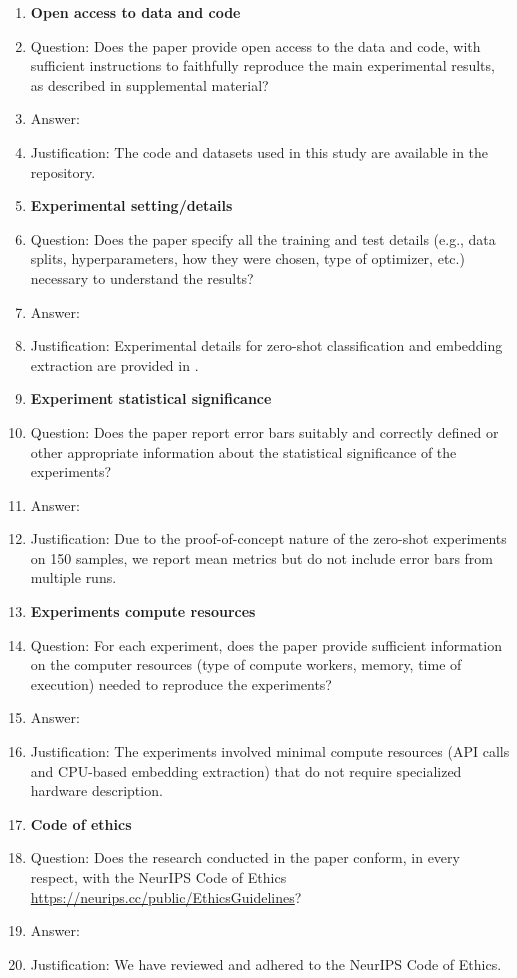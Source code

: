 \begin{enumerate}
\item {\bf Open access to data and code}
    \item[] Question: Does the paper provide open access to the data and code, with sufficient instructions to faithfully reproduce the main experimental results, as described in supplemental material?
    \item[] Answer: \answerYes{}
    \item[] Justification: The code and datasets used in this study are available in the repository.

\item {\bf Experimental setting/details}
    \item[] Question: Does the paper specify all the training and test details (e.g., data splits, hyperparameters, how they were chosen, type of optimizer, etc.) necessary to understand the results?
    \item[] Answer: \answerYes{}
    \item[] Justification: Experimental details for zero-shot classification and embedding extraction are provided in .

\item {\bf Experiment statistical significance}
    \item[] Question: Does the paper report error bars suitably and correctly defined or other appropriate information about the statistical significance of the experiments?
    \item[] Answer: \answerNA{}
    \item[] Justification: Due to the proof-of-concept nature of the zero-shot experiments on 150 samples, we report mean metrics but do not include error bars from multiple runs.

\item {\bf Experiments compute resources}
    \item[] Question: For each experiment, does the paper provide sufficient information on the computer resources (type of compute workers, memory, time of execution) needed to reproduce the experiments?
    \item[] Answer: \answerNA{}
    \item[] Justification: The experiments involved minimal compute resources (API calls and CPU-based embedding extraction) that do not require specialized hardware description.
    
\item {\bf Code of ethics}
    \item[] Question: Does the research conducted in the paper conform, in every respect, with the NeurIPS Code of Ethics \url{https://neurips.cc/public/EthicsGuidelines}?
    \item[] Answer: \answerYes{}
    \item[] Justification: We have reviewed and adhered to the NeurIPS Code of Ethics.


\end{enumerate}
